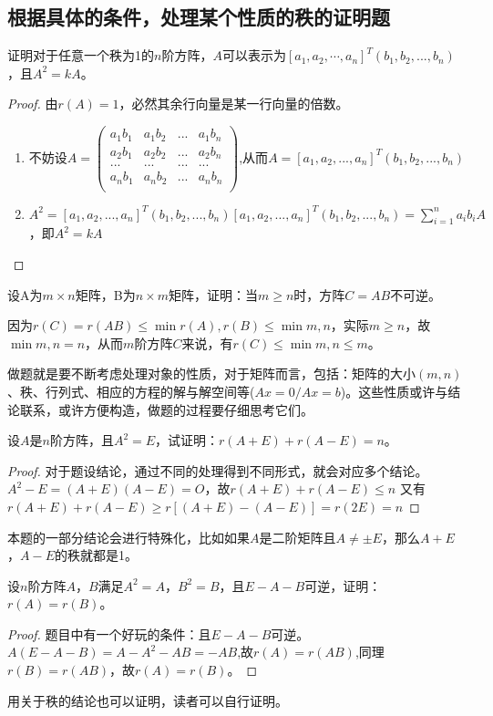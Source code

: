 \subsection{根据具体的条件，处理某个性质的秩的证明题}
\begin{problem}
	证明对于任意一个秩为1的$n$阶方阵，$A$可以表示为$[a_1,a_2, \cdots,a_n]^{T}(b_1,b_2,...,b_n)$，且$A^2=kA$。
\end{problem}
\begin{proof}
	由$r(A)=1$，必然其余行向量是某一行向量的倍数。
	\begin{enumerate}
		\item 不妨设$A=\left (
			\begin{matrix}
					a_1b_1 & a_1b_2 & ... & a_1b_n \\
					a_2b_1 & a_2b_2 & ... & a_2b_n \\
					...    & ...    & ... & ...    \\
					a_nb_1 & a_nb_2 & ... & a_nb_n \\
				\end{matrix}
			\right  )$,从而$A=[a_1,a_2,...,a_n]^T(b_1,b_2,...,b_n)$
		\item $A^2=[a_1,a_2,...,a_n]^T(b_1,b_2,...,b_n)[a_1,a_2,...,a_n]^T(b_1,b_2,...,b_n)=\sum_{i=1}^{n}a_ib_iA$，即$A^2=kA$
	\end{enumerate}
\end{proof}

\begin{problem}
	设A为$m\times n$矩阵，B为$n\times m$矩阵，证明：当$m\ge n$时，方阵$C=AB$不可逆。
\end{problem}
\begin{solution}
	因为$r(C)=r(AB)\leq\min{r(A),r(B)}\leq\min{m,n}$，实际$m\ge n$，故$\min{m,n}=n$，从而$m$阶方阵$C$来说，有$r(C)\leq\min{m,n}\le m$。
\end{solution}
\begin{remark}
	做题就是要不断考虑处理对象的性质，对于矩阵而言，包括：矩阵的大小$(m,n)$、秩、行列式、相应的方程的解与解空间等($Ax=0/Ax=b$)。这些性质或许与结论联系，或许方便构造，做题的过程要仔细思考它们。
\end{remark}

\begin{problem}
	设$A$是$n$阶方阵，且$A^2=E$，试证明：$r(A+E)+r(A-E)=n$。
\end{problem}
\begin{proof}
	对于题设结论，通过不同的处理得到不同形式，就会对应多个结论。
	$A^2-E=(A+E)(A-E)=O$，故$r(A+E)+r(A-E)\le n$
又有$r(A+E)+r(A-E)\ge r[(A+E)-(A-E)]=r(2E)=n$
\end{proof}
\begin{remark}
	本题的一部分结论会进行特殊化，比如如果$A$是二阶矩阵且$A\neq ±E$，那么$A+E$，$A-E$的秩就都是1。
\end{remark}

\begin{problem}
	设$n$阶方阵$A$，$B$满足$A^2=A$，$B^2=B$，且$E-A-B$可逆，证明：$r(A)=r(B)$。
\end{problem}
\begin{proof}
	题目中有一个好玩的条件：且$E-A-B$可逆。
	$A(E-A-B)=A-A^2-AB=-AB$,故$r(A)=r(AB)$,同理$r(B)=r(AB)$，故$r(A)=r(B)$。
\end{proof}
用关于秩的结论也可以证明，读者可以自行证明。